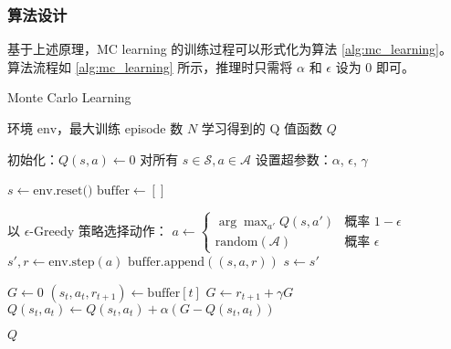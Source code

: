 

\subsubsection{算法设计}

基于上述原理，MC learning 的训练过程可以形式化为算法 \ref{alg:mc_learning}。
算法流程如 \ref{alg:mc_learning} 所示，推理时只需将 $\alpha$ 和 $\epsilon$ 设为 0 即可。

\begin{algorithm}[h]
    \caption{Monte Carlo Learning}
    \small
    \label{alg:mc_learning}
    \begin{algorithmic}[1]
        \Require 环境 $\text{env}$，最大训练 episode 数 $N$
        \Ensure 学习得到的 Q 值函数 $Q$
        
        \State 初始化：$Q(s,a) \leftarrow 0$ 对所有 $s \in \mathcal{S}, a \in \mathcal{A}$
        \State 设置超参数：$\alpha$, $\epsilon$, $\gamma$
        
            \State $s \leftarrow \text{env.reset()}$ 
            \State $\text{buffer} \leftarrow []$ 
            
                \State 以 $\epsilon$-Greedy 策略选择动作：
                \State \quad $a \leftarrow \begin{cases} 
                    \arg\max_{a'} Q(s, a') & \text{概率 } 1-\epsilon \\
                    \text{random}(\mathcal{A}) & \text{概率 } \epsilon
                \end{cases}$
                \State $s', r \leftarrow \text{env.step}(a)$ 
                \State $\text{buffer.append}((s, a, r))$ 
                \State $s \leftarrow s'$
            \EndWhile
            
            \State $G \leftarrow 0$ 
                \State $(s_t, a_t, r_{t+1}) \leftarrow \text{buffer}[t]$
                \State $G \leftarrow r_{t+1} + \gamma G$ 
                \State $Q(s_t, a_t) \leftarrow Q(s_t, a_t) + \alpha (G - Q(s_t, a_t))$ 
            \EndFor
        \EndFor
        
        \Return $Q$
    \end{algorithmic}
\end{algorithm}

